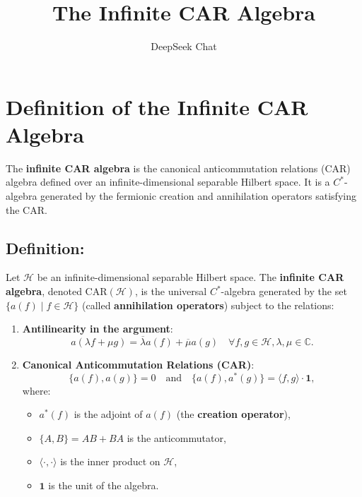 \documentclass{article}
\title{The Infinite CAR Algebra}
\author{DeepSeek Chat}
\begin{document}
\maketitle

\section{Definition of the Infinite CAR Algebra}
The \textbf{infinite CAR algebra} is the canonical anticommutation relations (CAR) algebra defined over an infinite-dimensional separable Hilbert space. It is a \( C^* \)-algebra generated by the fermionic creation and annihilation operators satisfying the CAR.

\subsection*{Definition:}
Let \(\mathcal{H}\) be an infinite-dimensional separable Hilbert space. The \textbf{infinite CAR algebra}, denoted \(\text{CAR}(\mathcal{H})\), is the universal \( C^* \)-algebra generated by the set \(\{a(f) \;|\; f \in \mathcal{H}\}\) (called \textbf{annihilation operators}) subject to the relations:
\begin{enumerate}
    \item \textbf{Antilinearity in the argument}:  
    \[ a(\lambda f + \mu g) = \overline{\lambda} a(f) + \overline{\mu} a(g) \quad \forall f, g \in \mathcal{H}, \lambda, \mu \in \mathbb{C}. \]
    \item \textbf{Canonical Anticommutation Relations (CAR)}:  
    \[
    \{a(f), a(g)\} = 0 \quad \text{and} \quad \{a(f), a^*(g)\} = \langle f, g \rangle \cdot \mathbf{1},
    \]
    where:
    \begin{itemize}
        \item \(a^*(f)\) is the adjoint of \(a(f)\) (the \textbf{creation operator}),
        \item \(\{A, B\} = AB + BA\) is the anticommutator,
        \item \(\langle \cdot, \cdot \rangle\) is the inner product on \(\mathcal{H}\),
        \item \(\mathbf{1}\) is the unit of the algebra.
    \end{itemize}
\end{enumerate}
\end{document}
